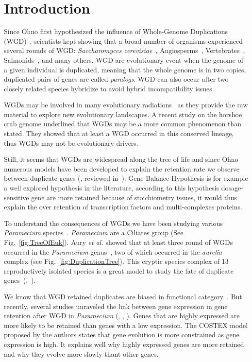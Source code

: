 \section*{Introduction}

Since Ohno first hypothesized the influence of Whole-Genome Duplications (WGD)~\citep{ohno_enormous_1970}, scientists kept showing that a broad number of organisms experienced several rounds of WGD: \textit{Saccharomyces cerevisiae}~\citep{kellis_proof_2004}, Angiosperms~\citep{arrigo_rarely_2012}, Vertebrates~\citep{dehal_two_2005}, Salmonids~\citep{alexandrou_genome_2013}, and many others. WGD are evolutionary event when the genome of a given individual is duplicated, meaning that the whole genome is in two copies, duplicated pairs of genes are called \textit{paralogs}. WGD can also occur after two closely related species hybridize to avoid hybrid incompatibility issues.

WGDs may be involved in many evolutionary radiations~\citep{alexandrou_genome_2013} as they provide the raw material to explore new evolutionary landscapes. A recent study on the horshoe crab genome underlined that WGDs may be a more common phenomenon than stated. They showed that at least a WGD occurred in this conserved lineage, thus WGDs may not be evolutionary drivers.

Still, it seems that WGDs are widespread along the tree of life and since Ohno numerous models have been developed to explain the retention rate we observe between duplicate genes (\citet{chain_odds_2011}, reviewed in~\citet{innan_evolution_2010}). Gene Balance Hypothesis is for example a well explored hypothesis in the literature, according to this hypothesis dosage-sensitive gene are more retained because of stoichiometry issues, it would thus explain the over retention of transcription factors and multi-complexes proteins.

To understand the consequences of WGDs we have been studying various \textit{Paramecium} species~\citep{beisson_paramecium_2010}. \textit{Paramecium} are a Ciliates group (See Fig.~\ref{fig:TreeOfEuk}). Aury \textit{et al.} showed that at least three round of WGDs occurred in the \textit{Paramecium} genus~\citep{aury_global_2006}, two of which occurred in the \textit{aurelia} complex (see Fig.~\ref{fig:DuplicationTree}). This cryptic species complex of 13 reproductively isolated species is a great model to study the fate of duplicate genes~(\citealt{catania_genetic_2009},~\citealt{mcgrath_insights_2014}).

We know that WGD retained duplicates are biased in functional category~\citep{edger_gene_2009}. But recently, several studies unraveled the link between gene expression in gene retention after WGD in \textit{Paramecium} (\citealt{gout_relationship_2010}, \citealt{arnaiz_gene_2010}, \citealt{chain_odds_2011}). Genes that are highly expressed are more likely to be retained than genes with a low expression. The COSTEX model proposed by the authors states that gene evolution is more constrained as gene expression is high. It explains well why highly expressed genes are more retained and why they evolve more slowly thant other genes.

